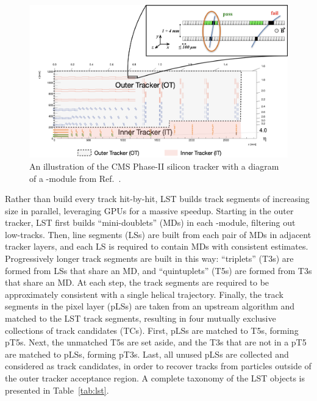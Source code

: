 \begin{figure}[!htb]
    \centering
    \includegraphics[width=0.75\linewidth]{fig/lst/tracker_with_pt_module.png}
    \caption[An illustration of the CMS Phase-II silicon tracker with a diagram of a \pt-module.]{
        An illustration of the CMS Phase-II silicon tracker with a diagram of a \pt-module from Ref.~\cite{CMS-DP-2023-075}. 
    }
    \label{fig:ph2_tracker}
\end{figure}

Rather than build every track hit-by-hit, LST builds track segments of increasing size in parallel, leveraging GPUs for a massive speedup. 
Starting in the outer tracker, LST first builds ``mini-doublets'' (MDs) in each \pt-module, filtering out low-\pt tracks. 
Then, line segments (LSs) are built from each pair of MDs in  adjacent tracker layers, and each LS is required to contain MDs with consistent \pt estimates. 
Progressively longer track segments are built in this way: ``triplets'' (T3s) are formed from LSs that share an MD, and ``quintuplets'' (T5s) are formed from T3s that share an MD. 
At each step, the track segments are required to be approximately consistent with a single helical trajectory. 
Finally, the track segments in the pixel layer (pLSs) are taken from an upstream algorithm and matched to the LST track segments, resulting in four mutually exclusive collections of track candidates (TCs). 
First, pLSs are matched to T5s, forming pT5s. 
Next, the unmatched T5s are set aside, and the T3s that are not in a pT5 are matched to pLSs, forming pT3s. 
Last, all unused pLSs are collected and considered as track candidates, in order to recover tracks from particles outside of the outer tracker acceptance region. 
A complete taxonomy of the LST objects is presented in Table~\ref{tab:lst}.

